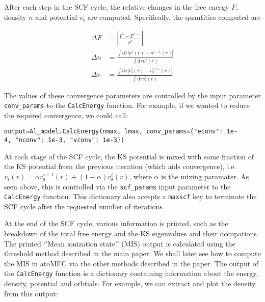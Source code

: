 \documentclass[11pt]{article}
\begin{document}
After each step in the SCF cycle, the relative changes in the free
energy \(F\), density \(n\) and potential \(v_\textrm{s}\) are computed.
Specifically, the quantities computed are

\begin{align}
    \Delta F &= \left|\frac{F^{i}-F^{i-1}}{F^{i}}\right| \\
    \Delta n &= \frac{\int \mathrm{d}r|n^i(r)-n^{i-1}(r)|}{\int \mathrm{d}r n^i(r)}\\
    \Delta v &= \frac{\int \mathrm{d}r|v^i_\textrm{s}(r)-v_\textrm{s}^{i-1}(r)|}{\int \mathrm{d}r v_\textrm{s}^i(r)}
\end{align}

The values of these convergence parameters are controlled by the input
parameter \texttt{conv\_params} to the \texttt{CalcEnergy} function. For
example, if we wanted to reduce the required convergence, we could call:

\texttt{output=Al\_model.CalcEnergy(nmax,\ lmax,\ conv\_params=\{"econv":\ 1e-4,\ "nconv":\ 1e-3,\ "vconv":\ 1e-3\})}

At each stage of the SCF cycle, the KS potential is mixed with some
fraction of the KS potential from the previous iteration (which aids
convergence),
i.e.~\(v_\textrm{s}(r) = \alpha v^{i+1}_\textrm{s}(r) + (1-\alpha) v^i_\textrm{s}(r)\),
where \(\alpha\) is the mixing paramater. As seen above, this is
controlled via the \texttt{scf\_params} input parameter to the
\texttt{CalcEnergy} function. This dictionary also accepts a
\texttt{maxscf} key to terminate the SCF cycle after the requested
number of iterations.

At the end of the SCF cycle, various information is printed, such as the
breakdown of the total free energy and the KS eigenvalues and their
occupations. The printed `'Mean ionization state'' (MIS) output is
calculated using the threshold method described in the main paper. We
shall later see how to compute the MIS in atoMEC via the other methods
described in the paper. The output of the \texttt{CalcEnergy} function
is a dictionary containing information about the energy, density,
potential and orbtials. For example, we can extract and plot the density
from this output:
\end{document}
